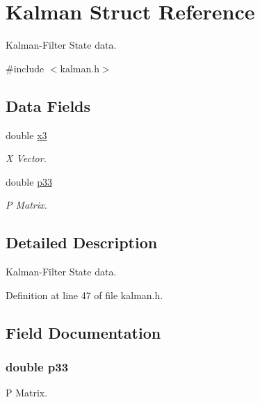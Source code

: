 \hypertarget{struct_kalman}{\section{Kalman Struct Reference}
\label{struct_kalman}
}


Kalman-\/\-Filter State data.  




{\ttfamily \#include $<$kalman.\-h$>$}

\subsection*{Data Fields}
\begin{DoxyCompactItemize}
\item 
double \hyperlink{struct_kalman_a98e99f64ddf7321e4eae52beca4b580f}{x3}
\begin{DoxyCompactList}\small\item\em X Vector. \end{DoxyCompactList}\item 
double \hyperlink{struct_kalman_a30801bc9a38fd4c527388e0725fa62f8}{p33}
\begin{DoxyCompactList}\small\item\em P Matrix. \end{DoxyCompactList}\end{DoxyCompactItemize}


\subsection{Detailed Description}
Kalman-\/\-Filter State data. 

Definition at line 47 of file kalman.\-h.



\subsection{Field Documentation}
\hypertarget{struct_kalman_a30801bc9a38fd4c527388e0725fa62f8}{
\subsubsection[{p33}]{\setlength{\rightskip}{0pt plus 5cm}double p33}}\label{struct_kalman_a30801bc9a38fd4c527388e0725fa62f8}


P Matrix. 



